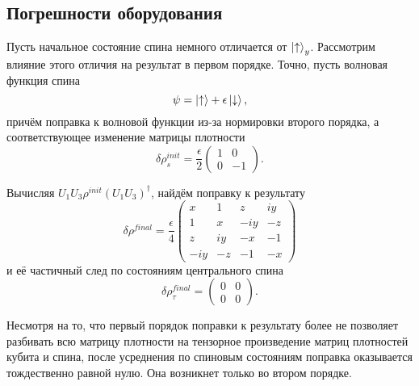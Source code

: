 \documentclass[a4paper,12pt]{article}
\theoremstyle{plain} %
\theoremstyle{definition} %
\theoremstyle{remark} %
\begin{document}
\subsection{Погрешности оборудования}

Пусть начальное состояние спина немного отличается от $\ket{\uparrow}_y$. Рассмотрим влияние этого отличия на результат в первом порядке. 
Точно, пусть волновая функция спина
\begin{equation}
    \psi = \ket{\uparrow} + \epsilon \ket{\downarrow},
\end{equation}
причём поправка к волновой функции из-за нормировки второго порядка, а соответствующее изменение матрицы плотности
\begin{equation}
    \delta\rho^{init}_s = \frac{\epsilon}{2}
    \begin{pmatrix}
        1 & 0 \\
        0 & -1 
    \end{pmatrix}.
\end{equation}

Вычисляя $U_1 U_3 \rho^{init} (U_1 U_3)^\dagger$, найдём поправку к результату
\begin{equation}
    \delta \rho^{final} = \frac{\epsilon}{4}
    \begin{pmatrix}
        x & 1 & z & i y \\
        1 & x & - i y & -z \\
        z & i y & -x & -1 \\
        - i y & - z & -1 & -x
    \end{pmatrix}
\end{equation}
и её частичный след по состояниям центрального спина
\begin{equation}
    \delta \rho^{final}_\tau = 
    \begin{pmatrix}
        0 & 0 \\
        0 & 0
    \end{pmatrix}.
\end{equation}

Несмотря на то, что первый порядок поправки к результату более не позволяет разбивать всю матрицу плотности на тензорное произведение матриц плотностей кубита и спина, после усреднения по спиновым состояниям поправка оказывается тождественно равной нулю. Она возникнет только во втором порядке.
\end{document}
